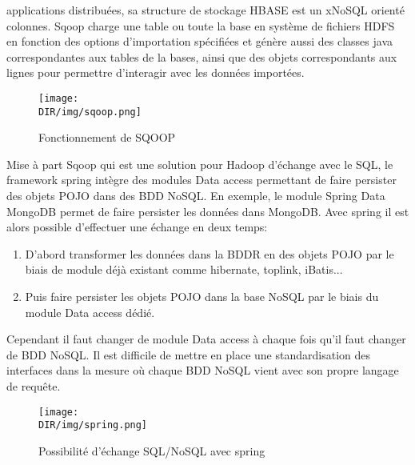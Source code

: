 applications distribuées, sa structure de stockage \textsf{HBASE} est
un x\textsf{NoSQL} orienté colonnes. \textsf{Sqoop} charge
une table ou toute la base en système de fichiers \textsf{HDFS} en
fonction des options d'importation spécifiées et génère aussi des
classes \textsf{java} correspondantes aux tables de la bases, ainsi
que des objets correspondants aux lignes pour permettre d'interagir
avec les données importées.
\begin {figure}[H]
       \centering
        \texttt{[image: \\DIR/img/sqoop.png]}	
        \caption{Fonctionnement de \textsf{SQOOP}}
	\label{sqoop}
  \end {figure}    
\noindent
Mise à part \textsf{Sqoop} qui est une solution pour \textsf{Hadoop}
d'échange avec le \textsf{SQL}, le framework
\textsf{spring} intègre des modules \textsf{Data access}\cite{springsource} permettant 
de faire persister des objets \textsf{POJO} dans des \textsf{BDD NoSQL}. En
exemple, le module \textsf{Spring Data MongoDB} permet de faire persister
les données dans \textsf{MongoDB}. Avec \textsf{spring} il est alors possible
d'effectuer une échange en deux temps:
\begin{enumerate}
\item D'abord transformer les données dans la \textsf{BDDR} en des objets 
      \textsf{POJO} par le biais de module déjà existant
      comme \textsf{hibernate, toplink, iBatis}...
\item Puis faire persister les objets \textsf{POJO} dans la base \textsf{NoSQL} par le biais du module 
      \textsf{Data access} dédié.    
\end{enumerate} 
Cependant il faut changer de module \textsf{Data access} à chaque fois
qu'il faut changer de \textsf{BDD NoSQL}. Il est difficile de mettre
en place une standardisation des interfaces dans la mesure où
chaque \textsf{BDD NoSQL} vient avec son propre langage de requête.
\begin {figure}[H]
       \centering
        \texttt{[image: \\DIR/img/spring.png]}	
        \caption{Possibilité d'échange \textsf{SQL/NoSQL} avec \textsf{spring}}
	\label{spring}
\end {figure}
